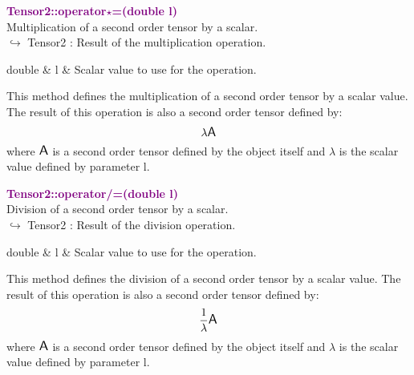 \textcolor{purple}{\textbf{Tensor2::operator$\star$=(double l)}}\label{Tensor2::operator*=(double l)}\\
Multiplication of a second order tensor by a scalar.\\ \hspace*{10mm}$\hookrightarrow$ Tensor2 : Result of the multiplication operation.

\begin{tcolorbox}[width=\textwidth,myArgs,tabularx={ll|R}]
double & l & Scalar value to use for the operation.
\end{tcolorbox}

This method defines the multiplication of a second order tensor by a scalar value.
The result of this operation is also a second order tensor defined by:
\begin{equation*}
\lambda \mbox{\large\ensuremath{\mathsf{A}}}
\end{equation*}
where $\mbox{\large\ensuremath{\mathsf{A}}}$ is a second order tensor defined by the object itself and $\lambda$ is the scalar value defined by parameter l.

\textcolor{purple}{\textbf{Tensor2::operator/=(double l)}}\label{Tensor2::operator/=(double l)}\\
Division of a second order tensor by a scalar.\\ \hspace*{10mm}$\hookrightarrow$ Tensor2 : Result of the division operation.

\begin{tcolorbox}[width=\textwidth,myArgs,tabularx={ll|R}]
double & l & Scalar value to use for the operation.
\end{tcolorbox}

This method defines the division of a second order tensor by a scalar value.
The result of this operation is also a second order tensor defined by:
\begin{equation*}
\frac{1}{\lambda} \mbox{\large\ensuremath{\mathsf{A}}}
\end{equation*}
where $\mbox{\large\ensuremath{\mathsf{A}}}$ is a second order tensor defined by the object itself and $\lambda$ is the scalar value defined by parameter l.

